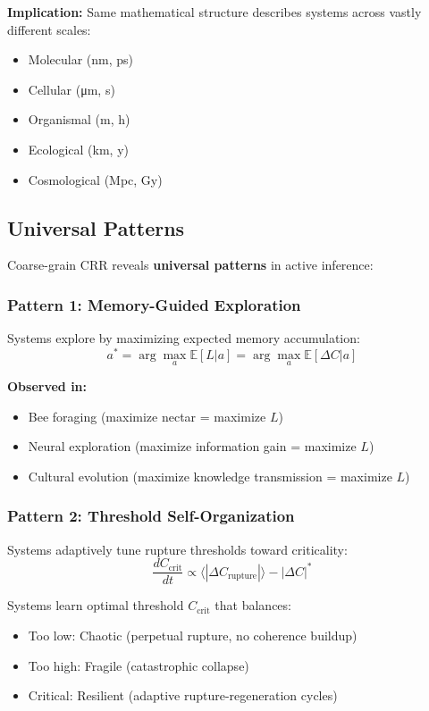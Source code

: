 \documentclass[11pt,a4paper]{article}
\theoremstyle{definition}
\theoremstyle{remark}
\begin{document}
\textbf{Implication:} Same mathematical structure describes systems across vastly different scales:
\begin{itemize}
\item Molecular (nm, ps)
\item Cellular (μm, s)
\item Organismal (m, h)
\item Ecological (km, y)
\item Cosmological (Mpc, Gy)
\end{itemize}

\subsection{Universal Patterns}

Coarse-grain CRR reveals \textbf{universal patterns} in active inference:

\subsubsection{Pattern 1: Memory-Guided Exploration}

Systems explore by maximizing expected memory accumulation:
\begin{equation}
a^* = \arg\max_a \mathbb{E}[L|a] = \arg\max_a \mathbb{E}[\Delta C|a]
\end{equation}

\textbf{Observed in:}
\begin{itemize}
\item Bee foraging (maximize nectar = maximize $L$)
\item Neural exploration (maximize information gain = maximize $L$)
\item Cultural evolution (maximize knowledge transmission = maximize $L$)
\end{itemize}

\subsubsection{Pattern 2: Threshold Self-Organization}

Systems adaptively tune rupture thresholds toward criticality:
\begin{equation}
\frac{dC_{\text{crit}}}{dt} \propto \langle |\Delta C_{\text{rupture}}| \rangle - |\Delta C|^*
\end{equation}

Systems learn optimal threshold $C_{\text{crit}}$ that balances:
\begin{itemize}
\item Too low: Chaotic (perpetual rupture, no coherence buildup)
\item Too high: Fragile (catastrophic collapse)
\item Critical: Resilient (adaptive rupture-regeneration cycles)
\end{itemize}
\end{document}
